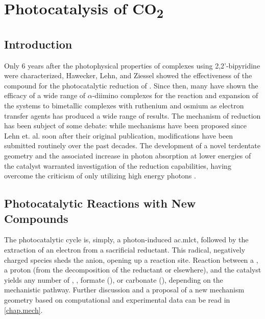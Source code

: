 \chapter{Photocatalysis of \texorpdfstring{CO\textsubscript{2}}{CO2}}\label{chap.co2}

\section{Introduction}

Only 6 years after the photophysical properties of  complexes using 2,2'-bipyridine were characterized\autocite{morse1976}, Hawecker, Lehn, and Ziessel showed the effectiveness of the compound for the photocatalytic reduction of \autocite{hawecker1983}. Since then, many have shown the efficacy of a wide range of $\alpha$-diimino complexes for the reaction\autocite{hawecker1986, kurz2006, portenkirchner2014} and expansion of the systems to bimetallic complexes with ruthenium and osmium as electron transfer agents has produced a wide range of results\autocite{rossenaar1996, takeda2008, tamaki2013}. The mechanism of reduction has been subject of some debate: while mechanisms have been proposed since Lehn et. al. soon after their original publication\autocite{hawecker1986}, modifications have been submitted routinely over the past decades\autocite{hayashi2003, morris2009, takeda2008, grills2010, agarwal2011, agarwal2012a, agarwal2012b, keith2013}. The development of a novel terdentate geometry and the associated increase in photon absorption at lower energies of the catalyst warranted investigation of the  reduction capabilities, having overcome the criticism of only utilizing high energy photons \autocite{kutal1985}. 

\section{Photocatalytic Reactions with New Compounds}

The photocatalytic cycle is, simply, a photon-induced \gls{ac.mlct}, followed by the extraction of an electron from a sacrificial reductant. This radical, negatively charged species sheds the anion, opening up a reaction site. Reaction between a , a proton (from the decomposition of the reductant or elsewhere), and the catalyst yields any number of , , formate (), or carbonate (), depending on the mechanistic pathway. Further discussion and a proposal of a new mechanism geometry based on computational and experimental data can be read in \autoref{chap.mech}.


